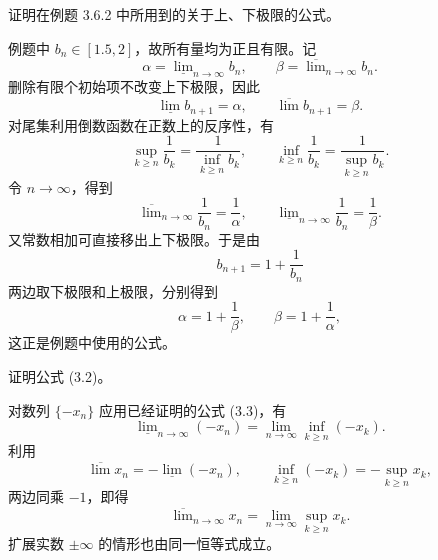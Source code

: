 \begin{xexercise}[7]
证明在例题 3.6.2 中所用到的关于上、下极限的公式。
\end{xexercise}
\begin{xsolution}
例题中 $b_n\in[1.5,2]$，故所有量均为正且有限。记
\[
  \alpha=\underline{\lim}_{n\to\infty}b_n,
  \qquad
  \beta=\overline{\lim}_{n\to\infty}b_n.
\]
删除有限个初始项不改变上下极限，因此
\[
  \underline{\lim}b_{n+1}=\alpha,
  \qquad
  \overline{\lim}b_{n+1}=\beta.
\]
对尾集利用倒数函数在正数上的反序性，有
\[
  \sup_{k\geqslant n}\frac1{b_k}
  =\frac1{\inf_{k\geqslant n}b_k},
  \qquad
  \inf_{k\geqslant n}\frac1{b_k}
  =\frac1{\sup_{k\geqslant n}b_k}.
\]
令 $n\to\infty$，得到
\[
  \overline{\lim}_{n\to\infty}\frac1{b_n}=\frac1\alpha,
  \qquad
  \underline{\lim}_{n\to\infty}\frac1{b_n}=\frac1\beta.
\]
又常数相加可直接移出上下极限。于是由
\[
  b_{n+1}=1+\frac1{b_n}
\]
两边取下极限和上极限，分别得到
\[
  \alpha=1+\frac1\beta,
  \qquad
  \beta=1+\frac1\alpha,
\]
这正是例题中使用的公式。
\end{xsolution}


\begin{xexercise}[8]
证明公式 (3.2)。
\end{xexercise}
\begin{xsolution}
对数列 $\{-x_n\}$ 应用已经证明的公式 (3.3)，有
\[
  \underline{\lim}_{n\to\infty}(-x_n)
  =\lim_{n\to\infty}\inf_{k\geqslant n}(-x_k).
\]
利用
\[
  \overline{\lim}x_n=-\underline{\lim}(-x_n),
  \qquad
  \inf_{k\geqslant n}(-x_k)
  =-\sup_{k\geqslant n}x_k,
\]
两边同乘 $-1$，即得
\[
  \overline{\lim}_{n\to\infty}x_n
  =\lim_{n\to\infty}\sup_{k\geqslant n}x_k.
\]
扩展实数 $\pm\infty$ 的情形也由同一恒等式成立。
\end{xsolution}


